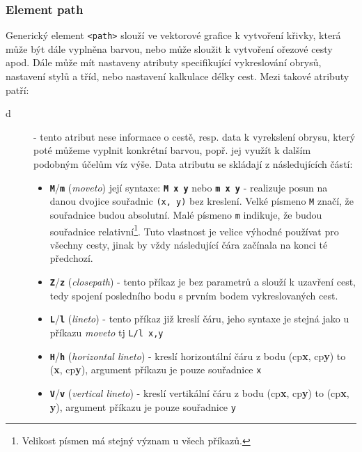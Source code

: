 \subsubsection{Element path}
Generický element \texttt{<path>} slouží ve vektorové grafice k vytvoření křivky, která může být dále vyplněna barvou, nebo může sloužit k vytvoření ořezové cesty apod. Dále může mít nastaveny atributy specifikující vykreslování obrysů, nastavení stylů a tříd, nebo nastavení kalkulace délky cest. Mezi takové atributy patří:

\begin{description}
	\item[d]  - tento atribut nese informace o cestě, resp. data k vyrekslení obrysu, který poté můžeme vyplnit konkrétní barvou, popř. jej využít k dalším podobným účelům víz výše. Data atributu se skládají z následujících částí:
	\begin{itemize}
		\item \texttt{\textbf{M}}/\texttt{\textbf{m}} (\textit{moveto}) její syntaxe: \texttt{\textbf{M x y}} nebo \texttt{\textbf{m x y}} - realizuje posun na danou dvojice souřadnic \texttt{(x, y)} bez kreslení. Velké písmeno \texttt{M} značí, že souřadnice budou absolutní. Malé písmeno \texttt{m} indikuje, že budou souřadnice relativní\footnote{Velikost písmen má stejný význam u všech příkazů.}. Tuto vlastnost je velice výhodné používat pro všechny cesty, jinak by vždy následující čára začínala na konci té předchozí.\\
		
		\item \texttt{\textbf{Z}}/\texttt{\textbf{z}} (\textit{closepath}) - tento příkaz je bez parametrů a slouží k uzavření cest, tedy spojení posledního bodu s prvním bodem vykreslovaných cest.\\
		
		\item \texttt{\textbf{L}}/\texttt{\textbf{l}} (\textit{lineto}) - tento příkaz již kreslí čáru, jeho syntaxe je  stejná jako u příkazu \textit{moveto} tj \texttt{L/l x,y}\\
		
		\item \texttt{\textbf{H}}/\texttt{\textbf{h}} (\textit{horizontal lineto}) - kreslí horizontální čáru z bodu (cp\textbf{x}, cp\textbf{y}) to (\textbf{x}, cp\textbf{y}), argument příkazu je pouze souřadnice \texttt{x}\\
		
		\item \texttt{\textbf{V}}/\texttt{\textbf{v}} (\textit{vertical lineto}) - kreslí vertikální čáru z bodu (cp\textbf{x}, cp\textbf{y}) to (cp\textbf{x}, \textbf{y}), argument příkazu je pouze souřadnice \texttt{y}\\
		

\end{itemize}
\end{description}
